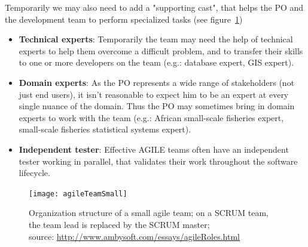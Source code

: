 \documentclass[11pt]{article} %
\begin{document}
Temporarily we may also need to add a "supporting cast", that helps the PO and the development team to perform specialized tasks (see figure~\ref{agile-pic})
\begin{itemize}
\item \textbf{Technical experts}: Temporarily the team may need the help of technical experts to help them overcome a difficult problem, and to transfer their skills to one or more developers on the team (e.g.: database expert, GIS expert).
\item \textbf{Domain experts}: As the PO represents a wide range of stakeholders (not just end users), it isn't reasonable to expect him to be an expert at every single nuance of the domain. Thus the PO may sometimes bring in domain experts to work with the team (e.g.: African small-scale fisheries expert, small-scale fisheries statistical systems expert). 
\item \textbf{Independent tester}: Effective AGILE teams often have an independent tester working in parallel, that validates their work throughout the software lifecycle. 
\end{itemize}

  \begin{figure}[!ht]%
    \begin{center} 
	\texttt{[image: agileTeamSmall]}
      \caption[Organization structure of a small agile team;]
{Organization structure of a small agile team; on a SCRUM team, the team lead is replaced by the SCRUM master;\\ source: \url{http://www.ambysoft.com/essays/agileRoles.html}}
      \label{agile-pic} %
    \end{center} 
  \end{figure}
\end{document}
